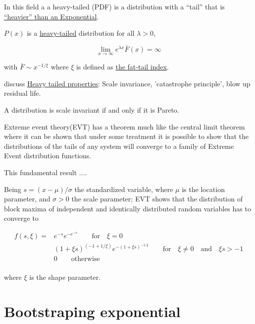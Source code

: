 In this field a a heavy-tailed  (PDF) is a distribution with a “tail” that is \href{http://users.cms.caltech.edu/~adamw/papers/2013-SIGMETRICS-heavytails.pdf}{“heavier” than an Exponential}.

$P(x)$ is a \underline{heavy-tailed} distribution for all $\lambda>0$, 

\[ \lim_{x\to\infty} e^{\lambda x}\bar{F}(x)=\infty\]

with $\bar{F}\sim x^{-1/\xi}$ where $\xi$ is defined as \href{https://math.stackexchange.com/questions/2357673/definition-of-tail-index-of-a-probability-distribution}{the \underline{fat-tail index}}.


discuss 	\href{https://docs.google.com/document/d/18AisjULqnRvs4i_ccdxvNVnvlEr9JIaeGdjIoH_cKEA/edit}{Heavy tailed properties}: Scale invariance, 'catastrophe principle', blow up residual life. 

A distribution is scale invariant if and only if it is Pareto.



Extreme event theory(EVT) has a theorem much like the central limit theorem where it can be shown that under some treatment it is possible to show that the distributions of the tails of any system will converge to a family of Extreme Event distribution functions. 

This fundamental result .... 


Being $s=(x-\mu)/\sigma$ the standardized variable, where $\mu$ is the location parameter, and $\sigma>0$ the scale parameter; EVT shows that the distribution of block maxima of  independent and identically distributed random variables has to converge to 

\begin{equation}
	\begin{aligned}
		f(s,\xi) =  &   e^{-s}e^{-e^{-s}}  \qquad \mathrm{for } \quad \xi =0 \\
		&  (1+\xi s  )^{(-1+1/\xi)} e^{-(1+\xi s)^{-1/\xi}}  \qquad \mathrm{for } \quad \xi \neq0 \quad\mathrm{ and }\quad \xi s >-1 \\
		&  0  \qquad \mathrm{otherwise } \\
	\end{aligned}
\end{equation}

where $\xi$ is the shape parameter.

\section{Bootstraping exponential }
\label{apx:boots}

